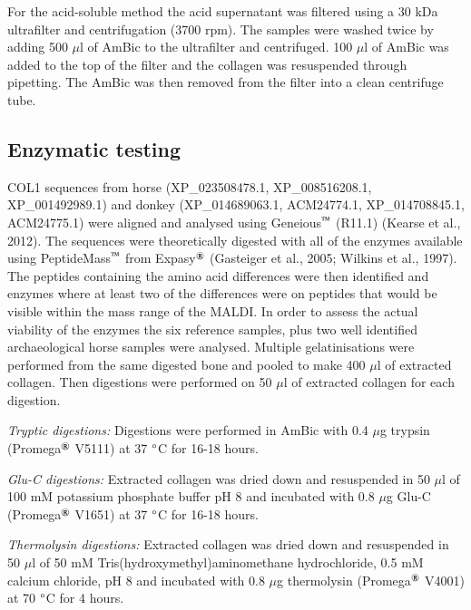 \documentclass[preprint, 3p, authoryear]{elsarticle} %
\begin{document}
For the acid-soluble method the acid supernatant was filtered using a 30 kDa ultrafilter and centrifugation (3700 rpm). The samples were washed twice by adding 500 \(\mu\)l of AmBic to the ultrafilter and centrifuged. 100 \(\mu\)l of AmBic was added to the top of the filter and the collagen was resuspended through pipetting. The AmBic was then removed from the filter into a clean centrifuge tube.

\hypertarget{enzymatic-testing}{%
\subsection{Enzymatic testing}\label{enzymatic-testing}}

COL1 sequences from horse (XP\_023508478.1, XP\_008516208.1, XP\_001492989.1) and donkey (XP\_014689063.1, ACM24774.1, XP\_014708845.1, ACM24775.1) were aligned and analysed using Geneious\(^\text{\texttrademark}\) (R11.1) (Kearse et al., 2012). The sequences were theoretically digested with all of the enzymes available using PeptideMass\(^\text{\texttrademark}\) from Expasy\(^\text{\textregistered}\) (Gasteiger et al., 2005; Wilkins et al., 1997). The peptides containing the amino acid differences were then identified and enzymes where at least two of the differences were on peptides that would be visible within the mass range of the MALDI. In order to assess the actual viability of the enzymes the six reference samples, plus two well identified archaeological horse samples were analysed. Multiple gelatinisations were performed from the same digested bone and pooled to make 400 \(\mu\)l of extracted collagen. Then digestions were performed on 50 \(\mu\)l of extracted collagen for each digestion.

\emph{Tryptic digestions:} Digestions were performed in AmBic with 0.4 \(\mu\)g trypsin (Promega\(^\text{\textregistered}\) V5111) at 37 \(\text{\textdegree}\)C for 16-18 hours.

\emph{Glu-C digestions:} Extracted collagen was dried down and resuspended in 50 \(\mu\)l of 100 mM potassium phosphate buffer pH 8 and incubated with 0.8 \(\mu\)g Glu-C (Promega\(^\text{\textregistered}\) V1651) at 37 \(\text{\textdegree}\)C for 16-18 hours.

\emph{Thermolysin digestions:} Extracted collagen was dried down and resuspended in 50 \(\mu\)l of 50 mM Tris(hydroxymethyl)aminomethane hydrochloride, 0.5 mM calcium chloride, pH 8 and incubated with 0.8 \(\mu\)g thermolysin (Promega\(^\text{\textregistered}\) V4001) at 70 \(\text{\textdegree}\)C for 4 hours.
\end{document}
